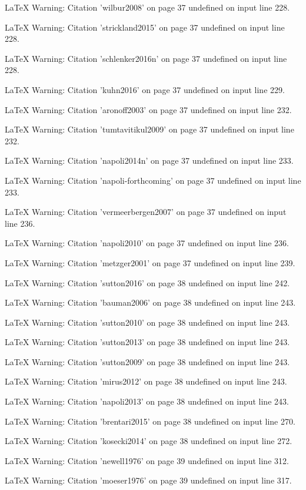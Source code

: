 LaTeX Warning: Citation 'wilbur2008' on page 37 undefined on input line 228.


LaTeX Warning: Citation 'strickland2015' on page 37 undefined on input line 228.


LaTeX Warning: Citation 'schlenker2016n' on page 37 undefined on input line 228.


LaTeX Warning: Citation 'kuhn2016' on page 37 undefined on input line 229.


LaTeX Warning: Citation 'aronoff2003' on page 37 undefined on input line 232.


LaTeX Warning: Citation 'tumtavitikul2009' on page 37 undefined on input line 232.


LaTeX Warning: Citation 'napoli2014n' on page 37 undefined on input line 233.


LaTeX Warning: Citation 'napoli-forthcoming' on page 37 undefined on input line 233.


LaTeX Warning: Citation 'vermeerbergen2007' on page 37 undefined on input line 236.


LaTeX Warning: Citation 'napoli2010' on page 37 undefined on input line 236.


LaTeX Warning: Citation 'metzger2001' on page 37 undefined on input line 239.


LaTeX Warning: Citation 'sutton2016' on page 38 undefined on input line 242.


LaTeX Warning: Citation 'bauman2006' on page 38 undefined on input line 243.


LaTeX Warning: Citation 'sutton2010' on page 38 undefined on input line 243.


LaTeX Warning: Citation 'sutton2013' on page 38 undefined on input line 243.


LaTeX Warning: Citation 'sutton2009' on page 38 undefined on input line 243.


LaTeX Warning: Citation 'mirus2012' on page 38 undefined on input line 243.


LaTeX Warning: Citation 'napoli2013' on page 38 undefined on input line 243.


LaTeX Warning: Citation 'brentari2015' on page 38 undefined on input line 270.


LaTeX Warning: Citation 'kosecki2014' on page 38 undefined on input line 272.


LaTeX Warning: Citation 'newell1976' on page 39 undefined on input line 312.


LaTeX Warning: Citation 'moeser1976' on page 39 undefined on input line 317.


